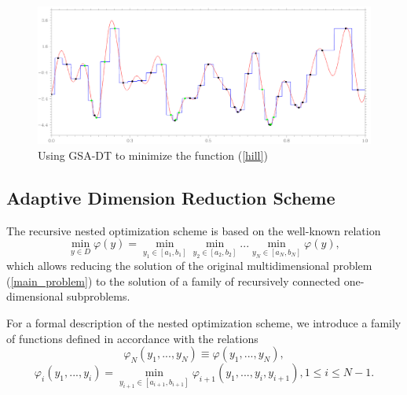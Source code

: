 \documentclass[entropy,article,submit,moreauthors,pdftex]{Definitions/mdpi}
\begin{document}
\begin{figure}[H]
\includegraphics[width=1.0\linewidth]{HillTree90.png}
\caption{Using GSA-DT to minimize the function (\ref{hill}) }
\label{fig2}
\end{figure}   


\subsection{Adaptive Dimension Reduction Scheme}

The recursive nested optimization scheme is based on the well-known relation  \cite{Grishagin2001} 
\begin{equation}\label{nested}
\min_{y \in D}\varphi(y) = \min_{y_1\in\left[a_1,b_1\right]}\min_{y_2\in\left[a_2,b_2\right]}...\min_{y_N\in\left[a_N,b_N\right]}\varphi(y),
\end{equation}
which allows reducing the solution of the original multidimensional problem (\ref{main_problem}) to the solution of a family of recursively connected one-dimensional subproblems.

For a formal description of the nested optimization scheme, we introduce a family of functions defined in accordance with the relations
\begin{equation}\label{nested_N}
\varphi_N(y_1,...,y_N) \equiv \varphi(y_1,...,y_N),
\end{equation}
\begin{equation}\label{nested_i}
\varphi_i(y_1,...,y_i) = \min_{ y_{i+1} \in\left[a_{i+1},b_{i+1}\right]} \varphi_{i+1}(y_1,...,y_i,y_{i+1}), 1\leq i\leq N-1.
\end{equation}
\end{document}
